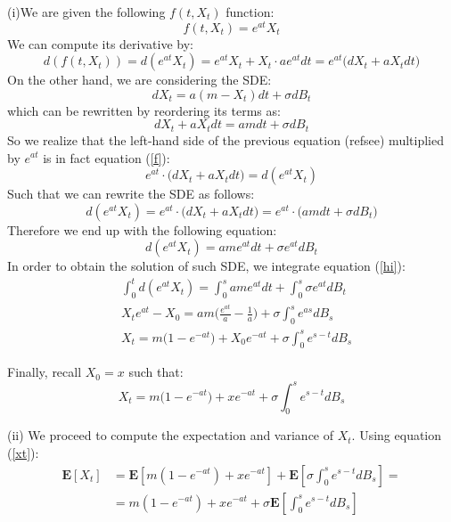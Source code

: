 \documentclass[12pt]{article}
\begin{document}
(i)We are given the following $f(t,X_t)$ function:
\begin{equation}
f(t,X_t)= e^{at}X_t
\end{equation}
We can compute its derivative by:
\begin{equation} \label{f}
d(f(t,X_t)) = d(e^{at}X_t) = e^{at}X_t+X_t\cdot a e^{at}dt = e^{at} \bigg(dX_t + aX_t dt \bigg)
\end{equation}
On the other hand, we are considering the SDE:
\begin{equation}
dX_t = a(m-X_t)dt + \sigma dB_t
\end{equation}
which can be rewritten by reordering its terms as:
\begin{equation}\label{sde}
dX_t + aX_tdt = amdt+\sigma dB_t
\end{equation}
So we realize that the left-hand side of the previous equation (ref{see}) multiplied by $e^{at}$ is in fact equation (\ref{f}):
\begin{equation}
e^{at} \cdot \bigg(dX_t + aX_tdt \bigg) = d(e^{at}X_t)
\end{equation}
Such that we can rewrite the SDE as follows:
\begin{equation}
 d(e^{at}X_t) = e^{at} \cdot \bigg(dX_t + aX_tdt \bigg)  = e^{at} \cdot \bigg( amdt+\sigma dB_t \bigg)
\end{equation}
Therefore we end up with the following equation:
\begin{equation}\label{hi}
 d(e^{at}X_t) = ame^{at}dt+\sigma e^{at} dB_t 
\end{equation}
In order to obtain the solution of such SDE, we integrate equation (\ref{hi}):
\begin{align}
& \int_0^t d(e^{at}X_t) = \int_0^s  ame^{at}dt+\int_0^s \sigma e^{at} dB_t \\
& X_te^{at}-X_0  = am\bigg(\frac{e^{at}}{a} - \frac{1}{a}\bigg) + \sigma \int_0^s e^{as}dB_s \\
& X_t = m\bigg(1-e^{-at}\bigg) + X_0 e^{-at} + \sigma \int_0^s e^{s-t}dB_s 
\end{align}

Finally, recall $X_0=x$ such that:
\begin{equation}\label{xt}
\boxed{X_t = m\bigg(1-e^{-at}\bigg) + x e^{-at} + \sigma \int_0^s e^{s-t}dB_s }
\end{equation}

(ii) We proceed to compute the expectation and variance of $X_t$. Using equation (\ref{xt}):
\begin{align}
\mathbf{E}[X_t] &= \mathbf{E}[m(1-e^{-at}) + x e^{-at} ] + \mathbf{E}[\sigma \int_0^s e^{s-t}dB_s ] = \\
&= m(1-e^{-at}) + x e^{-at} + \sigma \mathbf{E}[ \int_0^s e^{s-t}dB_s ]
\end{align}
\end{document}
